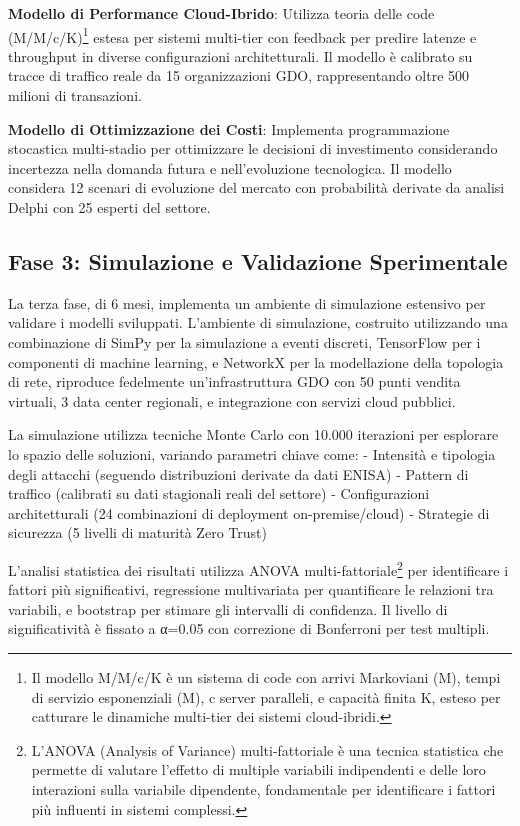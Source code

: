 \textbf{Modello di Performance Cloud-Ibrido}: Utilizza teoria delle code (M/M/c/K)\footnote{Il modello M/M/c/K è un sistema di code con arrivi Markoviani (M), tempi di servizio esponenziali (M), c server paralleli, e capacità finita K, esteso per catturare le dinamiche multi-tier dei sistemi cloud-ibridi.} estesa per sistemi multi-tier con feedback per predire latenze e throughput in diverse configurazioni architetturali. Il modello è calibrato su tracce di traffico reale da 15 organizzazioni GDO, rappresentando oltre 500 milioni di transazioni.

\textbf{Modello di Ottimizzazione dei Costi}: Implementa programmazione stocastica multi-stadio per ottimizzare le decisioni di investimento considerando incertezza nella domanda futura e nell'evoluzione tecnologica. Il modello considera 12 scenari di evoluzione del mercato con probabilità derivate da analisi Delphi con 25 esperti del settore.

\subsection{Fase 3: Simulazione e Validazione Sperimentale}

La terza fase, di 6 mesi, implementa un ambiente di simulazione estensivo per validare i modelli sviluppati. L'ambiente di simulazione, costruito utilizzando una combinazione di SimPy per la simulazione a eventi discreti, TensorFlow per i componenti di machine learning, e NetworkX per la modellazione della topologia di rete, riproduce fedelmente un'infrastruttura GDO con 50 punti vendita virtuali, 3 data center regionali, e integrazione con servizi cloud pubblici.

La simulazione utilizza tecniche Monte Carlo con 10.000 iterazioni per esplorare lo spazio delle soluzioni, variando parametri chiave come:
- Intensità e tipologia degli attacchi (seguendo distribuzioni derivate da dati ENISA)
- Pattern di traffico (calibrati su dati stagionali reali del settore)
- Configurazioni architetturali (24 combinazioni di deployment on-premise/cloud)
- Strategie di sicurezza (5 livelli di maturità Zero Trust)

L'analisi statistica dei risultati utilizza ANOVA multi-fattoriale\footnote{L'ANOVA (Analysis of Variance) multi-fattoriale è una tecnica statistica che permette di valutare l'effetto di multiple variabili indipendenti e delle loro interazioni sulla variabile dipendente, fondamentale per identificare i fattori più influenti in sistemi complessi.} per identificare i fattori più significativi, regressione multivariata per quantificare le relazioni tra variabili, e bootstrap per stimare gli intervalli di confidenza. Il livello di significatività è fissato a α=0.05 con correzione di Bonferroni per test multipli.

